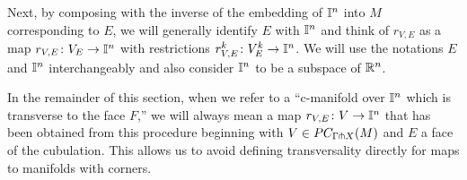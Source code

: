 Next, by composing with the inverse of the embedding of $\mathbb{I}^n$ into $M$ corresponding to $E$,
we will generally identify $E$ with $\mathbb{I}^n$ and think of $r_{V,E}$ as a map $r_{V,E} \colon V_E \to \mathbb{I}^n$ with restrictions $r_{V,E}^k \colon V_E^k \to \mathbb{I}^n$.
We will use the notations $E$ and $\mathbb{I}^n$ interchangeably and also consider $\mathbb{I}^n$ to be a subspace of $\mathbb{R}^n$.

In the remainder of this section, when we refer to a ``c-manifold over $\mathbb{I}^n$ which is transverse to the face $F$,'' we will always mean a map $r_{V,E} \colon V \to \mathbb{I}^n$ that has been obtained from this procedure beginning with $V \in PC_{\Gamma \pitchfork X}(M)$ and $E$ a face of the cubulation.
This allows us to avoid defining transversality directly for maps to manifolds with corners.


